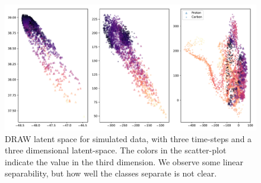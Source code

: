 \begin{figure}
	\centering
	\includegraphics[width=\textwidth, width=11cm]{latent.pdf}
	\caption{DRAW latent space for simulated data, with three time-steps and a three dimensional latent-space. The colors in the scatter-plot indicate the value in the third dimension. We observe some linear separability, but how well the classes separate is not clear.}
	\label{fig:draw_latent_demo}
\end{figure}



